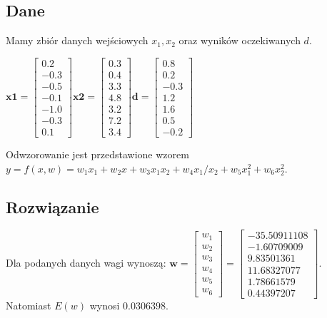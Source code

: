 \documentclass{article}
\begin{document}
\subsection{Dane}
Mamy zbiór danych wejściowych $x_1, x_2$ oraz wyników oczekiwanych $d$.
\begin{center}
$  
\textbf{x1} = 
    \begin{bmatrix}
        0.2 \\ -0.3 \\ -0.5 \\ -0.1 \\ -1.0 \\ -0.3 \\ 0.1
    \end{bmatrix} 
\textbf{x2} = 
    \begin{bmatrix}
        0.3 \\ 0.4 \\ 3.3 \\ 4.8 \\ 3.2 \\ 7.2 \\ 3.4
    \end{bmatrix} 
\textbf{d} = 
    \begin{bmatrix}
        0.8 \\ 0.2 \\ -0.3 \\ 1.2 \\ 1.6 \\ 0.5 \\ -0.2
    \end{bmatrix} 
$
\end{center}
Odwzorowanie jest przedstawione wzorem $y = f(x, w) = w_1x_1 + w_2x + w_3x_1x_2 + 
w_4x_1/x_2 +w_5x_1^2 +w_6x_2^2$.

\subsection{Rozwiązanie}
Dla podanych danych wagi wynoszą:
$
\textbf{w} = 
    \begin{bmatrix}
        w_1 \\ w_2 \\ w_3 \\ w_4 \\ w_5 \\ w_6
    \end{bmatrix}
=
    \begin{bmatrix}
        -35.50911108 \\ -1.60709009 \\ 9.83501361 \\ 11.68327077 \\ 1.78661579 \\ 0.44397207
    \end{bmatrix}
$.
Natomiast $E(w)$ wynosi $0.0306398$.
\end{document}
